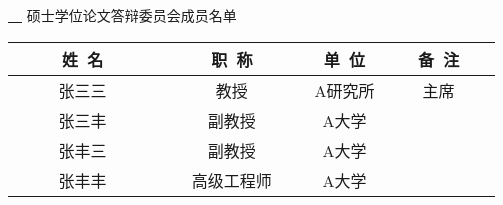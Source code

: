 \thispagestyle{empty}
\vspace*{2em}

\makeatletter
\begin{center}\STSong{}
 \underline{\ \@cauthor\ } 硕士学位论文答辩委员会成员名单
\end{center}
\makeatother

\begin{center}
\renewcommand{\arraystretch}{1.4}
  \begin{tabular}{|c|c|c|c|} \hline
   ~~~~~姓~名~~~~~ & ~~~~~职~称~~~~~ & \hspace{6em}单~位\hspace{6em} & ~~~备~注~~~\\\hline
张三三 &   教授 &  A研究所   & 主席  \\ \hline
张三丰 &   副教授 & 	A大学 &       \\ \hline
张丰三 &  副教授         &  A大学                 &       \\ \hline
张丰丰 &    高级工程师       & A大学                  &       \\ \hline
  \end{tabular}
\end{center}
